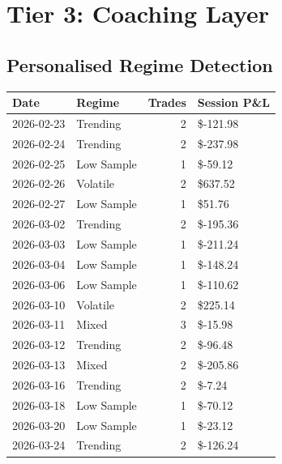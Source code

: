 \documentclass[11pt,a4paper]{article}
\begin{document}
\newpage
\section*{Tier 3: Coaching Layer}
\subsection*{Personalised Regime Detection}
\begin{tabular}{@{} l l r l @{}}
\toprule
\textbf{Date} & \textbf{Regime} & \textbf{Trades} & \textbf{Session P\&L} \\
\midrule

2026-02-23 & Trending & 2 & \color{badred}\$-121.98 \\

2026-02-24 & Trending & 2 & \color{badred}\$-237.98 \\

2026-02-25 & Low Sample & 1 & \color{badred}\$-59.12 \\

2026-02-26 & Volatile & 2 & \color{goodgreen}\$637.52 \\

2026-02-27 & Low Sample & 1 & \color{goodgreen}\$51.76 \\

2026-03-02 & Trending & 2 & \color{badred}\$-195.36 \\

2026-03-03 & Low Sample & 1 & \color{badred}\$-211.24 \\

2026-03-04 & Low Sample & 1 & \color{badred}\$-148.24 \\

2026-03-06 & Low Sample & 1 & \color{badred}\$-110.62 \\

2026-03-10 & Volatile & 2 & \color{goodgreen}\$225.14 \\

2026-03-11 & Mixed & 3 & \color{badred}\$-15.98 \\

2026-03-12 & Trending & 2 & \color{badred}\$-96.48 \\

2026-03-13 & Mixed & 2 & \color{badred}\$-205.86 \\

2026-03-16 & Trending & 2 & \color{badred}\$-7.24 \\

2026-03-18 & Low Sample & 1 & \color{badred}\$-70.12 \\

2026-03-20 & Low Sample & 1 & \color{badred}\$-23.12 \\

2026-03-24 & Trending & 2 & \color{badred}\$-126.24 \\

\bottomrule
\end{tabular}
\end{document}
